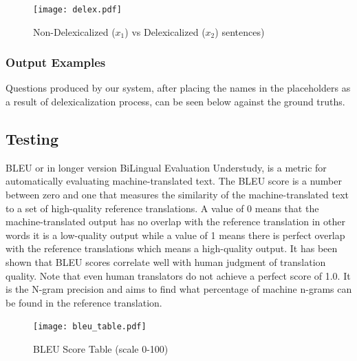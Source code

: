 \documentclass{mefsdp}
\begin{document}
	\begin{figure}[h!]
		\centering
		\texttt{[image: delex.pdf]}
		\caption{Non-Delexicalized ($x_1$) vs Delexicalized ($x_2$) sentences)\label{delex}}
	\end{figure}

	\subsubsection{Output Examples}
	Questions produced by our system, after placing the names in the placeholders as a result of delexicalization process, can be seen below against the ground truths. 
	\newline
	
	\noindent
	\newline
	
	\noindent
	\newline

	\noindent
	
	\subsection{Testing}
	BLEU or in longer version BiLingual Evaluation Understudy, is a metric for automatically evaluating machine-translated text. The BLEU score is a number between zero and one that measures the similarity of the machine-translated text to a set of high-quality reference translations. A value of 0 means that the machine-translated output has no overlap with the reference translation in other words it is a low-quality output while a value of 1 means there is perfect overlap with the reference translations which means a high-quality output. It has been shown that BLEU scores correlate well with human judgment of translation quality. Note that even human translators do not achieve a perfect score of 1.0. It is the N-gram precision and aims to find what percentage of machine n-grams can be found in the reference translation.
	\newline \par 
	\begin{figure}[h!]
		\centering
		\texttt{[image: bleu\_table.pdf]}
		\caption{BLEU Score Table (scale 0-100)}
	\end{figure}
	
\end{document}
